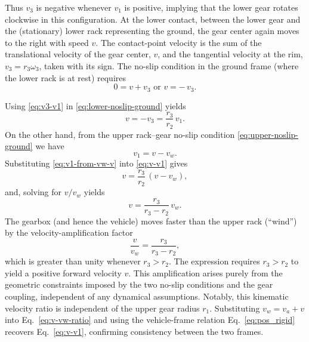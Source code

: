 \documentclass[reprint,aps,pra,longbibliography]{revtex4-2}
\begin{document}
Thus \(v_3\) is negative whenever \(v_1\) is positive, implying that the lower
gear rotates clockwise in this configuration.
At the lower contact, between the lower gear and the (stationary) lower rack
representing the ground, the gear center again moves to the right with speed
$v$.
The contact-point velocity is the sum of the translational velocity of the gear
center, \(v\), and the tangential velocity at the rim, \(v_3 = r_3 \omega_3\),
taken with its sign.
The no-slip condition in the ground frame (where the lower rack is at rest)
requires
\begin{equation}
0 = v + v_3
\text{ or }
v = -\,v_3.
\label{eq:lower-noslip-ground}
\end{equation}

Using \eqref{eq:v3-v1} in \eqref{eq:lower-noslip-ground} yields
\begin{equation}
v = -v_3 = \frac{r_3}{r_2}\,v_1.
\label{eq:v-v1}
\end{equation}
On the other hand, from the upper rack--gear no-slip condition
\eqref{eq:upper-noslip-ground} we have
\begin{equation}
v_1 = v - v_w.
\label{eq:v1-from-vw-v}
\end{equation}
Substituting \eqref{eq:v1-from-vw-v} into \eqref{eq:v-v1} gives
\[
v = \frac{r_3}{r_2}\,(v - v_w),
\]
and, solving for $ {v}/{v_w}$  yields
\begin{equation}
 v = \frac{r_3}{r_3 - r_2}\, {v_w}.
\label{eq:v-vw-ratio}
\end{equation}
The gearbox (and hence the vehicle) moves faster than the upper rack
(``wind'') by the velocity-amplification factor
\begin{equation}
 \frac{v}{v_w} = \frac{r_3}{r_3 - r_2},
\label{eq:amp-v-vw-ratio}
\end{equation}
which is greater than unity whenever $r_3 > r_2$.
The expression requires \(r_3 > r_2\) to yield a positive forward velocity \(v\).
This amplification arises purely from the geometric constraints imposed by
the two no-slip conditions and the gear coupling, independent of any
dynamical assumptions.
Notably, this kinematic
velocity ratio is independent of the upper gear radius $r_1$.
Substituting $v_w= v_a + v$ into Eq.~\eqref{eq:v-vw-ratio} and using the vehicle-frame relation Eq.~\eqref{eq:pos_rigid} recovers Eq.~\eqref{eq:v-v1}, confirming consistency between the two frames.
\end{document}
